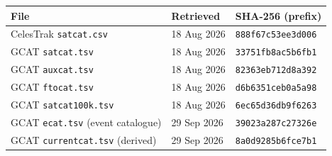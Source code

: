 \begin{center}\small
\begin{tabular}{lll}
\toprule
File & Retrieved & SHA-256 (prefix) \\
\midrule
CelesTrak \texttt{satcat.csv} & 18 Aug 2026 & \texttt{888f67c53ee3d006} \\
GCAT \texttt{satcat.tsv} & 18 Aug 2026 & \texttt{33751fb8ac5b6fb1} \\
GCAT \texttt{auxcat.tsv} & 18 Aug 2026 & \texttt{82363eb712d8a392} \\
GCAT \texttt{ftocat.tsv} & 18 Aug 2026 & \texttt{d6b6351ceb0a5a98} \\
GCAT \texttt{satcat100k.tsv} & 18 Aug 2026 & \texttt{6ec65d36db9f6263} \\
GCAT \texttt{ecat.tsv} (event catalogue) & 29 Sep 2026 & \texttt{39023a287c27326e} \\
GCAT \texttt{currentcat.tsv} (derived) & 29 Sep 2026 & \texttt{8a0d9285b6fce7b1} \\
\bottomrule
\end{tabular}
\end{center}
